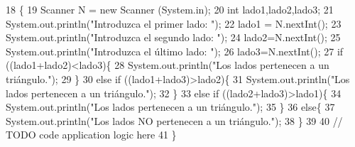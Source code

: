 \begin{DoxyCode}
18                                            \{
19     Scanner N = \textcolor{keyword}{new} Scanner (System.in);
20     \textcolor{keywordtype}{int} lado1,lado2,lado3;
21     System.out.println(\textcolor{stringliteral}{"Introduzca el primer lado: "});
22         lado1 = N.nextInt();
23     System.out.println(\textcolor{stringliteral}{"Introduzca el segundo lado: "});
24         lado2=N.nextInt();
25     System.out.println(\textcolor{stringliteral}{"Introduzca el último lado: "});
26         lado3=N.nextInt();
27     \textcolor{keywordflow}{if} ((lado1+lado2)<lado3)\{
28         System.out.println(\textcolor{stringliteral}{"Los lados pertenecen a un triángulo."});
29     \}
30     \textcolor{keywordflow}{else} \textcolor{keywordflow}{if} ((lado1+lado3)>lado2)\{
31         System.out.println(\textcolor{stringliteral}{"Los lados pertenecen a un triángulo."});
32     \}
33     \textcolor{keywordflow}{else} \textcolor{keywordflow}{if} ((lado2+lado3)>lado1)\{
34         System.out.println(\textcolor{stringliteral}{"Los lados pertenecen a un triángulo."});
35     \}
36     \textcolor{keywordflow}{else}\{
37         System.out.println(\textcolor{stringliteral}{"Los lados NO pertenecen a un triángulo."});
38     \}    
39 
40         \textcolor{comment}{// TODO code application logic here}
41     \}
\end{DoxyCode}
